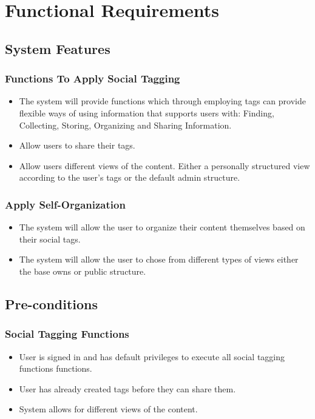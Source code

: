\documentclass[12pt, oneside]{article}
\begin{document}
\section{Functional Requirements}

\subsection{System Features}

\subsubsection{Functions To Apply Social Tagging}
\begin{itemize}
\item The system will provide functions which through employing tags can provide flexible ways of using information that supports users with: Finding, Collecting, Storing, Organizing and Sharing Information.
\item Allow users to share their tags.
\item Allow users different views of the content. Either a personally structured view according to the user's tags or the default admin structure.
\end{itemize}

\subsubsection{Apply Self-Organization}
\begin{itemize}
\item The system will allow the user to organize their content themselves based on their social tags.
\item The system will allow the user to chose from different types of views either the base owns or public structure.
\end{itemize}
\subsection{Pre-conditions}
\subsubsection{Social Tagging Functions}    
\begin{itemize}
\item User is signed in and has default privileges to execute all social tagging functions functions.
\item User has already created tags before they can share them.
\item  System allows for different views of the content.
\end{itemize}
\end{document}

